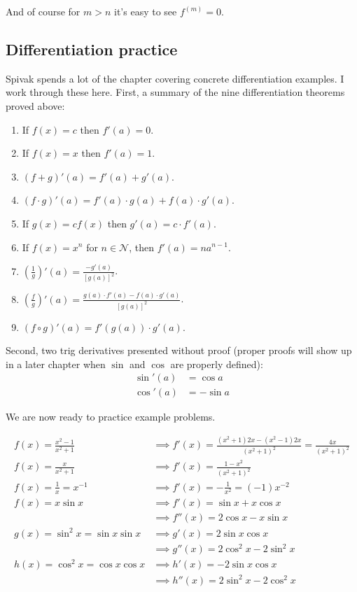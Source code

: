And of course for $m>n$ it's easy to see $f^{(m)}=0$.

\subsection{Differentiation practice}
Spivak spends a lot of the chapter covering concrete differentiation
examples. I work through these here. First, a summary of the nine
differentiation theorems proved above:
\begin{enumerate}
\item If $f(x)=c$ then $f'(a)=0$.
\item If $f(x)=x$ then $f'(a)=1$.
\item $(f+g)'(a)=f'(a)+g'(a)$.
\item $(f\cdot g)'(a)=f'(a)\cdot g(a)+f(a)\cdot g'(a)$.
\item If $g(x)=cf(x)$ then $g'(a)=c\cdot f'(a)$.
\item If $f(x)=x^n$ for $n\in\mathcal{N}$, then $f'(a)=na^{n-1}$.
\item $\left(\frac{1}{g}\right)'(a)=\frac{-g'(a)}{{[g(a)]}^2}$.
\item $\left(\frac{f}{g}\right)'(a)=\frac{g(a)\cdot f'(a)-f(a)\cdot
    g'(a)}{[g(a)]^2}$.
\item $(f\circ g)'(a)=f'(g(a))\cdot g'(a)$.
\end{enumerate}

Second, two trig derivatives presented without proof (proper proofs
will show up in a later chapter when $\sin$ and $\cos$ are properly
defined):
\begin{align*}
  \sin'(a)&=\cos a\\
  \cos'(a)&=-\sin a
\end{align*}

We are now ready to practice example problems.

\begin{align*}
f(x)=\frac{x^2-1}{x^2+1}&\implies
  f'(x)=\frac{(x^2+1)2x-(x^2-1)2x}{(x^2+1)^2}=\frac{4x}{(x^2+1)^2}\\
f(x)=\frac{x}{x^2+1}&\implies f'(x)=\frac{1-x^2}{(x^2+1)^2}\\
  f(x)=\frac{1}{x}=x^{-1}&\implies f'(x)=-\frac{1}{x^2}=(-1)x^{-2}\\
  f(x)=x\sin x&\implies f'(x)=\sin x+x\cos x\\
                        &\implies f''(x)=2\cos x-x\sin x\\
  g(x)=\sin^2x=\sin x\sin x&\implies g'(x)=2\sin x\cos x\\
                        &\implies g''(x)=2\cos^2 x-2\sin^2 x\\
  h(x)=\cos^2 x=\cos x\cos x&\implies h'(x)=-2\sin x \cos x\\
                        &\implies h''(x)=2\sin^2x-2\cos^2 x
\end{align*}

